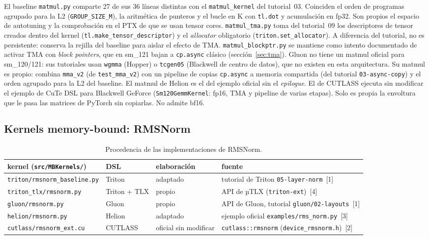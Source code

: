 El baseline \texttt{matmul.py} comparte 27 de sus 36 líneas distintas con el
\texttt{matmul\_kernel} del tutorial~03. Coinciden el orden de programas agrupado para la
L2 (\texttt{GROUP\_SIZE\_M}), la aritmética de punteros y el bucle en K con
\texttt{tl.dot} y acumulación en fp32. Son propios el espacio de autotuning y la
comprobación en el PTX de que se usan tensor cores. \texttt{matmul\_tma.py} toma del
tutorial~09 los descriptores de tensor creados dentro del kernel
(\texttt{tl.make\_tensor\_descriptor}) y el \emph{allocator} obligatorio
(\texttt{triton.set\_allocator}). A diferencia del tutorial, no es persistente: conserva
la rejilla del baseline para aislar el efecto de TMA. \texttt{matmul\_blockptr.py} se
mantiene como intento documentado de activar TMA con \emph{block pointers}, que en
sm\_121 bajan a \texttt{cp.async} clásico (sección~\ref{sec:tma}). Gluon no tiene un matmul oficial para sm\_120/121: sus tutoriales usan \texttt{wgmma}
(Hopper) o \texttt{tcgen05} (Blackwell de centro de datos), que no existen en esta
arquitectura. Su matmul es propio: combina \texttt{mma\_v2} (de \texttt{test\_mma\_v2}) con un
pipeline de copias \texttt{cp.async} a memoria compartida (del tutorial
\texttt{03-async-copy}) y el orden agrupado para la L2 del baseline. El matmul de Helion
es el del ejemplo oficial sin el \emph{epilogue}. El de CUTLASS ejecuta sin modificar el
ejemplo de CuTe DSL para Blackwell GeForce (\texttt{Sm120GemmKernel}: fp16, TMA y pipeline de
varias etapas). Solo es propia la envoltura que le pasa las matrices de PyTorch sin copiarlas.
No admite bf16.

\subsection{Kernels memory-bound: RMSNorm}

\begin{table}[htbp]
  \centering\small
  \begin{tabularx}{\linewidth}{lllX}
    \toprule
    kernel (\texttt{src/MBKernels/}) & DSL & elaboración & fuente \\
    \midrule
    \texttt{triton/rmsnorm\_baseline.py} & Triton & adaptado & tutorial de Triton \texttt{05-layer-norm}~[1] \\
    \texttt{triton\_tlx/rmsnorm.py} & Triton + TLX & propio & API de µTLX (\texttt{triton-ext})~[4] \\
    \texttt{gluon/rmsnorm.py} & Gluon & propio & API de Gluon, tutorial \texttt{gluon/02-layouts}~[1] \\
    \texttt{helion/rmsnorm.py} & Helion & adaptado & ejemplo oficial \texttt{examples/rms\_norm.py}~[3] \\
    \texttt{cutlass/rmsnorm\_ext.cu} & CUTLASS & oficial sin modificar & \texttt{cutlass::rmsnorm} (\texttt{device\_rmsnorm.h})~[2] \\
    \bottomrule
  \end{tabularx}
  \caption{Procedencia de las implementaciones de RMSNorm.}
  \label{tab:procedencia-mb}
\end{table}

